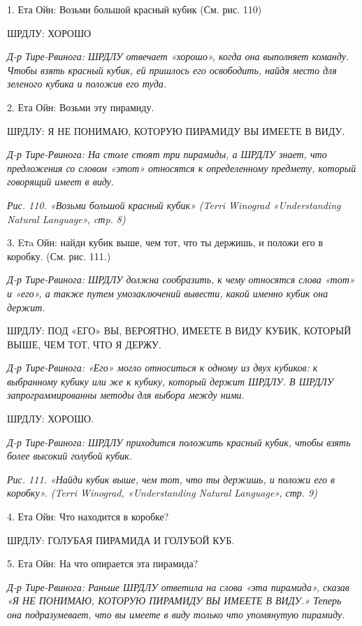 \documentclass[../main.tex]{subfiles}
\begin{document}
\begin{dialogue}

\EmptyItem

1. Ета Ойн: Возьми большой красный кубик (См. рис. 110)

ШРДЛУ: ХОРОШО

\emph{Д-р Тире-Рвинога: ШРДЛУ отвечает «хорошо», когда она выполняет команду. Чтобы взять красный кубик, ей пришлось его освободить, найдя место для зеленого кубика и положив его туда.}

2. Ета Ойн: Возьми эту пирамиду.

ШРДЛУ: Я НЕ ПОНИМАЮ, КОТОРУЮ ПИРАМИДУ ВЫ ИМЕЕТЕ В ВИДУ.

\emph{Д-р Тире-Рвинога: На столе стоят три пирамиды, а ШРДЛУ знает, что предложения со словом «этот» относятся к определенному предмету, который говорящий имеет в виду.}

\emph{Рис. 110. «Возьми большой красный кубик» (Terri Winograd «Understanding Natural Language», cтp. 8)}

3. Eтa Ойн: найди кубик выше, чем тот, что ты держишь, и положи его в коробку. (См. рис. 111.)

\emph{Д-р Тире-Рвинога: ШРДЛУ должна сообразить, к чему относятся слова «тот» и «его», а также путем умозаключений вывести, какой именно кубик она держит.}

ШРДЛУ: ПОД «ЕГО» ВЫ, ВЕРОЯТНО, ИМЕЕТЕ В ВИДУ КУБИК, КОТОРЫЙ ВЫШЕ, ЧЕМ ТОТ, ЧТО Я ДЕРЖУ.

\emph{Д-р Тире-Рвинога: «Его» могло относиться к одному из двух кубиков: к выбранному кубику или же к кубику, который держит ШРДЛУ. В ШРДЛУ запрограммированны методы для выбора между ними.}

ШРДЛУ: ХОРОШО.

\emph{Д-р Тире-Рвинога: ШРДЛУ приходится положить красный кубик, чтобы взять более высокий голубой кубик.}

\emph{Рис. 111. «Найди кубик выше, чем тот, что ты держишь, и положи его в коробку». (Terri Winograd, «Understanding Natural Language», стр. 9)}

4. Ета Ойн: Что находится в коробке?

ШРДЛУ: ГОЛУБАЯ ПИРАМИДА И ГОЛУБОЙ КУБ.

5. Ета Ойн: На что опирается эта пирамида?

\emph{Д-р Тире-Рвинога: Раньше ШРДЛУ ответила на слова «эта пирамида», сказав «Я НЕ ПОНИМАЮ, КОТОРУЮ ПИРАМИДУ ВЫ ИМЕЕТЕ В ВИДУ.» Теперь она подразумевает, что вы имеете в виду только что упомянутую пирамиду.}


\end{dialogue}
\end{document}
